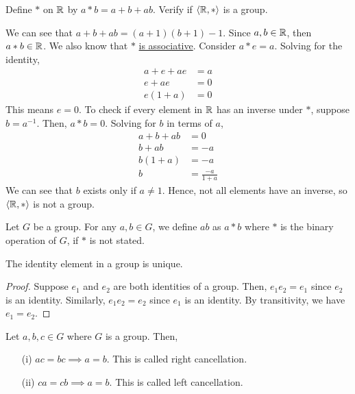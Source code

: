 \begin{example}
\begin{itemize}
            
        \end{itemize}
    \end{example}

    \begin{example}
        Define \(*\) on \(\mathbb{R}\) by \(a * b = a + b + ab\). Verify if \(\langle \mathbb{R}, * \rangle\) is a group.

        We can see that \(a + b + ab = (a + 1)(b + 1) - 1\). Since \(a,b\in\mathbb{R}\), then \(a * b\in\mathbb{R}\). We also know that \(*\) \hyperref[exm:starAssoc]{is associative}. Consider \(a * e = a\). Solving for the identity,
        \begin{align*}
            a + e + ae &= a \\
            e + ae &= 0 \\
            e(1 + a) &= 0
        \end{align*}
        This means \(e = 0\). To check if every element in \(\mathbb{R}\) has an inverse under \(*\), suppose \(b = a^{-1}\). Then, \(a * b = 0\). Solving for \(b\) in terms of \(a\),
        \begin{align*}
            a + b + ab &= 0 \\
            b + ab &= -a \\
            b(1 + a) &= -a \\
            b &= \frac{-a}{1 + a}
        \end{align*}
        We can see that \(b\) exists only if \(a \neq 1\). Hence, not all elements have an inverse, so \(\langle \mathbb{R}, * \rangle\) is not a group. 
    \end{example}

    \begin{note}
        Let \(G\) be a group. For any \(a, b\in G\), we define \(ab\) as \(a*b\) where \(*\) is the binary operation of \(G\), if \(*\) is not stated.
    \end{note}

    \begin{thm}
        The identity element in a group is unique.
    \end{thm}

    \begin{proof}
        Suppose \(e_1\) and \(e_2\) are both identities of a group. Then, \(e_1e_2 = e_1\) since \(e_2\) is an identity. Similarly, \(e_1e_2 = e_2\) since \(e_1\) is an identity. By transitivity, we have \(e_1 = e_2\).
    \end{proof}

    \begin{thm}
        Let \(a, b, c\in G\) where \(G\) is a group. Then,
        \begin{enumerate}
            \item[(i)] \(ac = bc \implies a = b\). This is called right cancellation.
            \item[(ii)] \(ca = cb \implies a = b\). This is called left cancellation.
        \end{enumerate}
    \end{thm}

